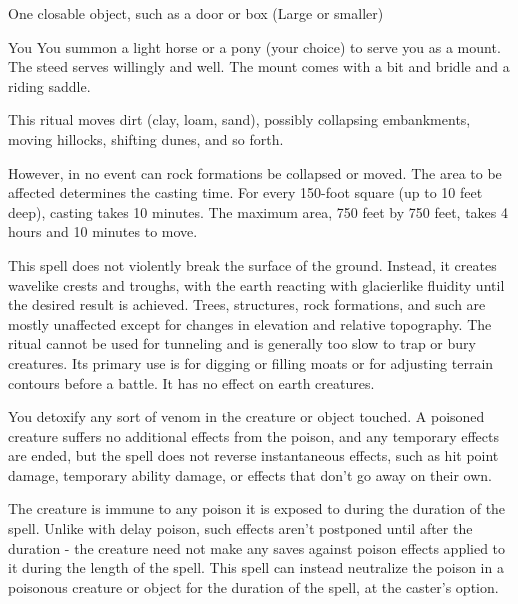 \begin{spelltarget}{One closable object, such as a door or box (Large or smaller)}
\begin{spelltarget}{You}
\spelldur{\durext \dismissable}
\spelleffect You summon a light horse or a pony (your choice) to serve you as a mount. The steed serves willingly and well. The mount comes with a bit and bridle and a riding saddle.

\spelleffect This ritual moves dirt (clay, loam, sand), possibly collapsing embankments, moving hillocks, shifting dunes, and so forth.
\par However, in no event can rock formations be collapsed or moved. The area to be affected determines the casting time. For every 150-foot square (up to 10 feet deep), casting takes 10 minutes. The maximum area, 750 feet by 750 feet, takes 4 hours and 10 minutes to move.
\par This spell does not violently break the surface of the ground. Instead, it creates wavelike crests and troughs, with the earth reacting with glacierlike fluidity until the desired result is achieved. Trees, structures, rock formations, and such are mostly unaffected except for changes in elevation and relative topography.
\spellnotes The ritual cannot be used for tunneling and is generally too slow to trap or bury creatures. Its primary use is for digging or filling moats or for adjusting terrain contours before a battle. It has no effect on earth creatures.

\spelldur{\durext \dismissable}
\spelleffect You detoxify any sort of venom in the creature or object touched. A poisoned  creature suffers no additional effects from  the poison, and any temporary effects are ended, but the spell does not reverse  instantaneous effects, such as hit point  damage, temporary ability damage, or  effects that don't go away on their own.
\par The creature is immune to any poison it  is exposed to during the duration of the  spell. Unlike with delay poison, such effects aren't postponed until after the duration - the creature need not make any saves  against poison effects applied to it during  the length of the spell. This spell can instead neutralize the  poison in a poisonous creature or object  for the duration of the spell, at the caster's  option.


\end{spelltarget}
\end{spelltarget}
